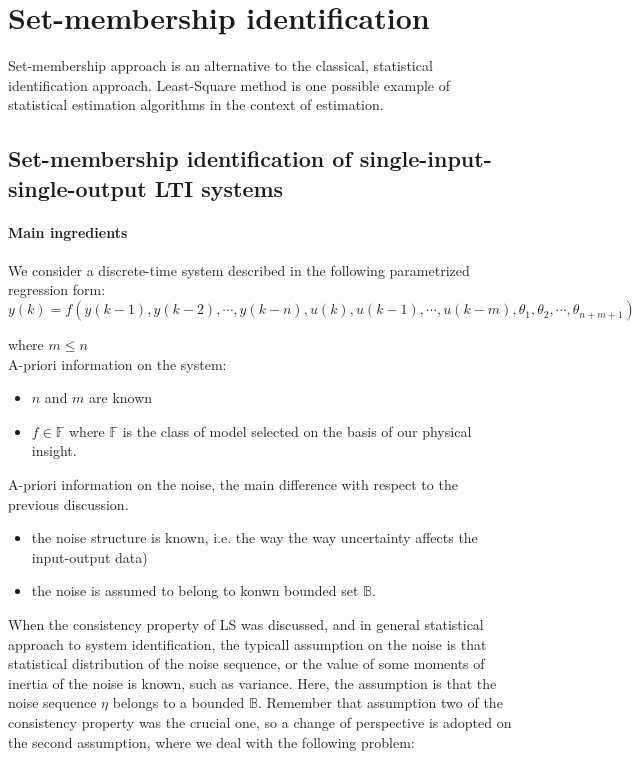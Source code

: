 \chapter{Set-membership identification}    %

Set-membership approach is an alternative to the classical, statistical identification approach. Least-Square method is one possible example of statistical estimation algorithms in the context of estimation.\\
\section{Set-membership identification of single-input-single-output LTI systems}
\subsubsection{Main ingredients}

We consider a discrete-time system described in the following parametrized regression form:\\
\begin{equation}
y(k) = f(y(k-1), y(k-2), \cdots, y(k-n), u(k), u(k-1), \cdots, u(k-m), \theta_1, \theta_2, \cdots, \theta_{n+m+1})
\end{equation}

where \(m\leq n\)\\
A-priori information on the system:
\begin{itemize}
    \item \(n\) and \(m\) are known
    \item \(f \in \mathbb{F}\) where \(\mathbb{F}\) is the class of model selected on the basis of our physical insight. 
\end{itemize}


A-priori information on the noise, the main difference with respect to the previous discussion.
\begin{itemize}
    \item the noise structure is known, i.e. the way the way uncertainty affects the input-output data)
    \item the noise is assumed to belong to konwn bounded set \(\mathbb{B}\).
\end{itemize}

When the consistency property of LS was discussed, and in general statistical approach to system identification, the typicall assumption on the noise is that statistical distribution of the noise sequence, or the value of some moments of inertia of the noise is known, such as variance. Here, the assumption is that the noise sequence \(\eta\) belongs to a bounded \(\mathbb{B}\). Remember that assumption two of the consistency property was the crucial one, so a change of perspective is adopted on the second assumption, where we deal with the following problem:

